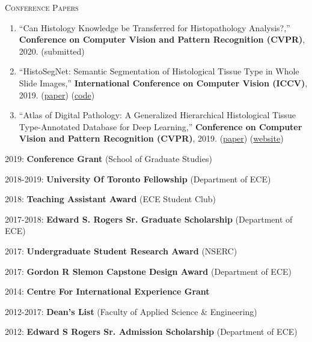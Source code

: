 \documentclass[letterpaper, 12pt]{cv_style}
\begin{document}
\textsc{Conference Papers}
\begin{enumerate}
	\item ``Can Histology Knowledge be Transferred for Histopathology Analysis?,'' \textbf{Conference on Computer Vision and Pattern Recognition (CVPR)}, 2020. (submitted)
	\item ``HistoSegNet: Semantic Segmentation of Histological Tissue Type in Whole Slide Images,'' \textbf{International Conference on Computer Vision (ICCV)}, 2019. (\href{http://openaccess.thecvf.com/content_ICCV_2019/papers/Chan_HistoSegNet_Semantic_Segmentation_of_Histological_Tissue_Type_in_Whole_Slide_ICCV_2019_paper.pdf}{paper}) (\href{https://github.com/lyndonchan/hsn_v1}{code})
	\item ``Atlas of Digital Pathology: A Generalized Hierarchical Histological Tissue Type-Annotated Database for Deep Learning,'' \textbf{ Conference on Computer Vision and Pattern Recognition (CVPR)}, 2019. (\href{http://openaccess.thecvf.com/content_CVPR_2019/html/Hosseini_Atlas_of_Digital_Pathology_A_Generalized_Hierarchical_Histological_Tissue_Type-Annotated_CVPR_2019_paper.html}{paper}) (\href{http://www.dsp.utoronto.ca/projects/ADP/}{website})
\end{enumerate}

\begin{ditem}
	\item 2019: \textbf{Conference Grant} (School of Graduate Studies)
	\item 2018-2019: \textbf{University Of Toronto Fellowship} (Department of ECE)
	\item 2018: \textbf{Teaching Assistant Award} (ECE Student Club)
	\item 2017-2018: \textbf{Edward S. Rogers Sr. Graduate Scholarship} (Department of ECE)
	\item 2017: \textbf{Undergraduate Student Research Award} (NSERC)
	\item 2017: \textbf{Gordon R Slemon Capstone Design Award} (Department of ECE)
	\item 2014: \textbf{Centre For International Experience Grant}
	\item 2012-2017: \textbf{Dean's List} (Faculty of Applied Science \& Engineering)
	\item 2012: \textbf{Edward S Rogers Sr. Admission Scholarship} (Department of ECE)
\end{ditem}
\end{document}
